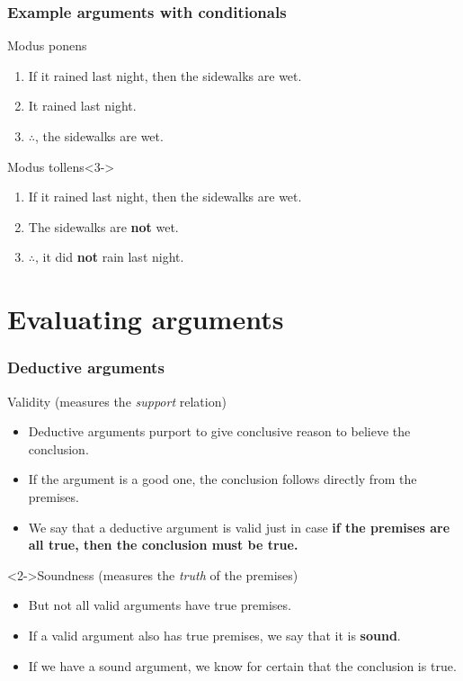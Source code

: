 \documentclass[10pt,letterpaper,xcolor=dvipsnames,handout]{beamer}
\begin{document}
\begin{frame}
  \frametitle{Example arguments with conditionals}
  
  \begin{block}{Modus ponens}
  \begin{enumerate}
    \item If it rained last night, then the sidewalks are wet.
    \item It rained last night. 
    \item $\therefore$, the sidewalks are wet.
  \end{enumerate}
  \end{block}
  
  \begin{block}{Modus tollens}<3->
  \begin{enumerate}
    \item If it rained last night, then the sidewalks are wet.
    \item The sidewalks are \textbf{not} wet. 
    \item $\therefore$, it did \textbf{not} rain last night.
  \end{enumerate}
  \end{block}
  
\end{frame}



\section{Evaluating arguments}

\begin{frame}
\frametitle{Deductive arguments}

\begin{block}{Validity (measures the \textit{support} relation)}
\begin{itemize}
  \item Deductive arguments purport to give conclusive reason to believe the conclusion.
  \item If the argument is a good one, the conclusion follows directly from the premises.
  \item We say that a deductive argument is valid just in case \textbf{if the premises are all true, then the conclusion must be true.}
\end{itemize}
\end{block}

\begin{block}<2->{Soundness (measures the \textit{truth} of the premises)}
\begin{itemize}
  \item But not all valid arguments have true premises.
  \item If a valid argument also has true premises, we say that it is \textbf{sound}.
  \item If we have a sound argument, we know for certain that the conclusion is true.
\end{itemize}
\end{block}

\end{frame}
\end{document}

